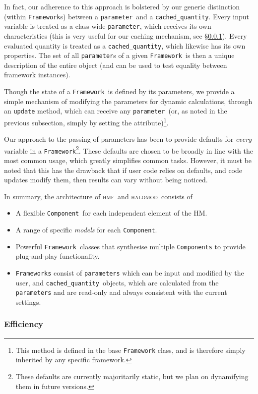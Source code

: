 \documentclass[5p,aas_macros]{elsarticle}
\newcommand{\halomod}{\textsc{halomod}\xspace} %
\newcommand{\hmf}{\textsc{hmf}\xspace} %
\newcommand{\framework}{\texttt{Framework}\xspace} %
\newcommand{\component}{\texttt{Component}\xspace} %
\newcommand{\parameter}{\texttt{parameter}\xspace} %
\newcommand{\cached}{\texttt{cached\_quantity}\xspace} %
\begin{document}
In fact, our adherence to this approach is bolstered by our generic distinction (within \texttt{Framework}s) between a \parameter\ and a \cached. Every input variable is treated as a class-wide \parameter, which receives its own characteristics (this is very useful for our caching mechanism, see \S\ref{sec:halomod:overview:efficiency}). Every evaluated quantity is treated as a \cached, which likewise has its own properties. The set of all \texttt{parameter}s of a given \framework\ is then a unique description of the entire object (and can be used to test equality between framework instances). 

Though the state of a \framework\ is defined by its parameters, we provide a simple mechanism of modifying the parameters for dynamic calculations, through an \verb|update| method, which can receive any \parameter\ (or, as noted in the previous subsection, simply by setting the attribute)\footnote{This method is defined in the base \texttt{Framework} class, and is therefore simply inherited by any specific framework.}.

Our approach to the passing of parameters has been to provide defaults for \textit{every} variable in a \framework\footnote{These defaults are currently majoritarily static, but we plan on dynamifying them in future versions.}. These defaults are chosen to be broadly in line with the most common usage, which greatly simplifies common tasks. However, it must be noted that this has the drawback that if user code relies on defaults, and code updates modify them, then results can vary without being noticed. 

In summary, the architecture of \hmf\ and \halomod\ consists of
\begin{itemize}
    \item A flexible \component\ for each independent element of the HM.
    \item A range of specific \textit{models} for each \component.
    \item Powerful \framework\ classes that synthesise multiple \verb|Components| to provide plug-and-play functionality.
    \item \texttt{Frameworks} consist of \texttt{parameters} which can be input and modified by the user, and \cached\ objects, which are calculated from the \verb|parameters| and are read-only and always consistent with the current settings.
\end{itemize}



\subsubsection{Efficiency}
\label{sec:halomod:overview:efficiency}
\end{document}
